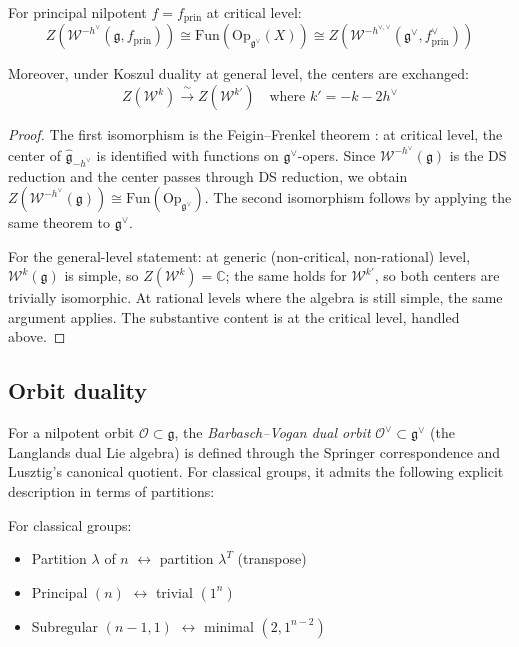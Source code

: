 \begin{theorem}\label{thm:w-center-langlands}
For principal nilpotent $f = f_{\mathrm{prin}}$ at critical level:
\begin{equation}
Z(\mathcal{W}^{-h^\vee}(\mathfrak{g}, f_{\mathrm{prin}})) \cong \mathrm{Fun}(\mathrm{Op}_{\mathfrak{g}^\vee}(X)) \cong Z(\mathcal{W}^{-h^{\vee,\vee}}(\mathfrak{g}^\vee, f_{\mathrm{prin}}^\vee))
\end{equation}

Moreover, under Koszul duality at general level, the centers are exchanged:
\begin{equation}
Z(\mathcal{W}^k) \xrightarrow{\;\sim\;} Z(\mathcal{W}^{k'}) \quad \text{where } k' = -k - 2h^\vee
\end{equation}
\end{theorem}

\begin{proof}
The first isomorphism is the Feigin--Frenkel theorem \cite{Feigin-Frenkel}: at critical level, the center of $\widehat{\mathfrak{g}}_{-h^\vee}$ is identified with functions on $\mathfrak{g}^\vee$-opers.  Since $\mathcal{W}^{-h^\vee}(\mathfrak{g})$ is the DS reduction and the center passes through DS reduction, we obtain $Z(\mathcal{W}^{-h^\vee}(\mathfrak{g})) \cong \mathrm{Fun}(\mathrm{Op}_{\mathfrak{g}^\vee})$.  The second isomorphism follows by applying the same theorem to $\mathfrak{g}^\vee$.

For the general-level statement: at generic (non-critical, non-rational) level, $\mathcal{W}^k(\mathfrak{g})$ is simple, so $Z(\mathcal{W}^k) = \mathbb{C}$; the same holds for $\mathcal{W}^{k'}$, so both centers are trivially isomorphic.  At rational levels where the algebra is still simple, the same argument applies.  The substantive content is at the critical level, handled above.
\end{proof}

\subsection{Orbit duality}

\begin{definition}
For a nilpotent orbit $\mathcal{O} \subset \mathfrak{g}$, the \emph{Barbasch--Vogan dual orbit} $\mathcal{O}^\vee \subset \mathfrak{g}^\vee$ (the Langlands dual Lie algebra) is defined through the Springer correspondence and Lusztig's canonical quotient.  For classical groups, it admits the following explicit description in terms of partitions:

For classical groups:
\begin{itemize}
\item Partition $\lambda$ of $n$ $\leftrightarrow$ partition $\lambda^T$ (transpose)
\item Principal $(n)$ $\leftrightarrow$ trivial $(1^n)$
\item Subregular $(n-1,1)$ $\leftrightarrow$ minimal $(2,1^{n-2})$
\end{itemize}
\end{definition}

